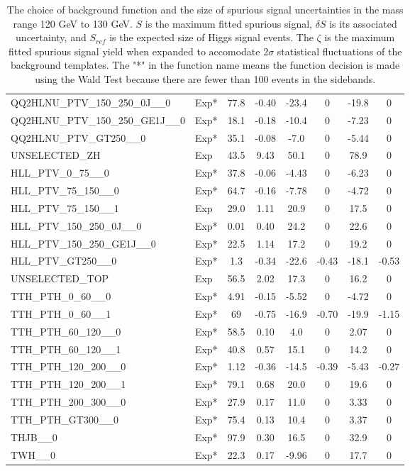 \begin{table}[!h]
\begin{adjustbox}{width={\textwidth},totalheight={\textheight},keepaspectratio}
\begin{tabular}{llcccccc}
 QQ2HLNU\_PTV\_150\_250\_0J\_\_0 & Exp* & 77.8 & -0.40 & -23.4 & 0 & -19.8 & 0 \\
 QQ2HLNU\_PTV\_150\_250\_GE1J\_\_0 & Exp* & 18.1 & -0.18 & -10.4 & 0 & -7.23 & 0 \\
 QQ2HLNU\_PTV\_GT250\_\_0 & Exp* & 35.1 & -0.08 & -7.0 & 0 & -5.44 & 0 \\
 UNSELECTED\_ZH & Exp & 43.5 & 9.43 & 50.1 & 0 & 78.9 & 0 \\
 HLL\_PTV\_0\_75\_\_0 & Exp* & 37.8 & -0.06 & -4.43 & 0 & -6.23 & 0 \\
 HLL\_PTV\_75\_150\_\_0 & Exp* & 64.7 & -0.16 & -7.78 & 0 & -4.72 & 0 \\
 HLL\_PTV\_75\_150\_\_1 & Exp & 29.0 & 1.11 & 20.9 & 0 & 17.5 & 0 \\
 HLL\_PTV\_150\_250\_0J\_\_0 & Exp* & 0.01 & 0.40 & 24.2 & 0 & 22.6 & 0 \\
 HLL\_PTV\_150\_250\_GE1J\_\_0 & Exp* & 22.5 & 1.14 & 17.2 & 0 & 19.2 & 0 \\
 HLL\_PTV\_GT250\_\_0 & Exp* & 1.3 & -0.34 & -22.6 & -0.43 & -18.1 & -0.53 \\
 UNSELECTED\_TOP & Exp & 56.5 & 2.02 & 17.3 & 0 & 16.2 & 0 \\
 TTH\_PTH\_0\_60\_\_0 & Exp* & 4.91 & -0.15 & -5.52 & 0 & -4.72 & 0 \\
 TTH\_PTH\_0\_60\_\_1 & Exp* & 69 & -0.75 & -16.9 & -0.70 & -19.9 & -1.15 \\
 TTH\_PTH\_60\_120\_\_0 & Exp* & 58.5 & 0.10 & 4.0 & 0 & 2.07 & 0 \\
 TTH\_PTH\_60\_120\_\_1 & Exp* & 40.8 & 0.57 & 15.1 & 0 & 14.2 & 0 \\
 TTH\_PTH\_120\_200\_\_0 & Exp* & 1.12 & -0.36 & -14.5 & -0.39 & -5.43 & -0.27 \\
 TTH\_PTH\_120\_200\_\_1 & Exp* & 79.1 & 0.68 & 20.0 & 0 & 19.6 & 0 \\
 TTH\_PTH\_200\_300\_\_0 & Exp* & 27.9 & 0.17 & 11.0 & 0 & 3.33 & 0 \\
 TTH\_PTH\_GT300\_\_0 & Exp* & 75.4 & 0.13 & 10.4 & 0 & 3.37 & 0 \\
 THJB\_\_0 & Exp* & 97.9 & 0.30 & 16.5 & 0 & 32.9 & 0 \\
 TWH\_\_0 & Exp* & 22.3 & 0.17 & -9.96 & 0 & 17.7 & 0 \\
       \hline
      \hline
      \end{tabular}
      \end{adjustbox}
      \caption{The choice of background function and the size of spurious signal uncertainties in the mass range 120 GeV to 130 GeV. $S$ is the maximum fitted spurious signal, $\delta S$ is its associated uncertainty, and $S_{ref}$ is the expected size of Higgs signal events. The $\zeta$ is the maximum fitted spurious signal yield when expanded to accomodate $2\sigma$ statistical fluctuations of the background templates. The "*" in the function name means the function decision is made using the Wald Test because there are fewer than 100 events in the sidebands.
   \label{tab:spurious_sig2}   }
\end{table}

